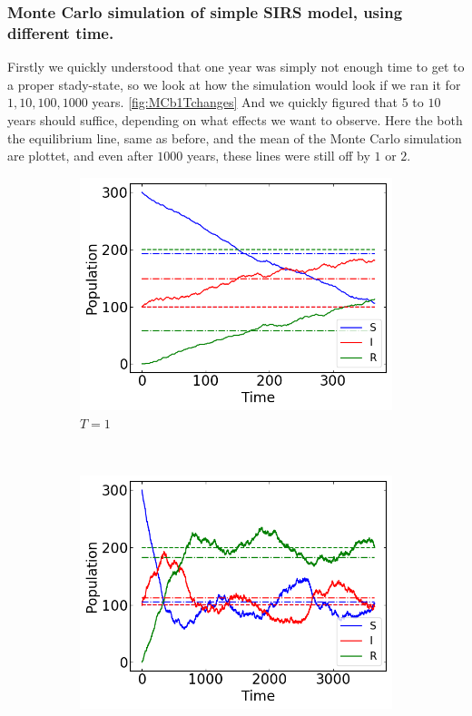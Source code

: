 \subsubsection{Monte Carlo simulation of simple SIRS model, using different time.}
	Firstly we quickly understood that one year was simply not enough time to get to a proper stady-state, so we look at how the simulation would look if we ran it for $1,10,100,1000$ years. \ref{fig:MCb1Tchanges} And we quickly figured that $5$ to $10$ years should suffice, depending on what effects we want to observe. Here the both the equilibrium line, same as before, and the mean of the Monte Carlo simulation are plottet, and even after $1000$ years, these lines were still off by $1$ or $2$. 

\begin{figure}[H]
    \centering
    \begin{subfigure}{0.49\textwidth}
        \centering
        \includegraphics[width=\linewidth]{../fig/texfig/MC_T1.png}
        \caption{$T = 1$}
    \end{subfigure}%
     ~ 
    \begin{subfigure}{0.49\textwidth}
         \centering
         \includegraphics[width=\linewidth]{../fig/texfig/MC_T10.png}

\end{subfigure}
\end{figure}
